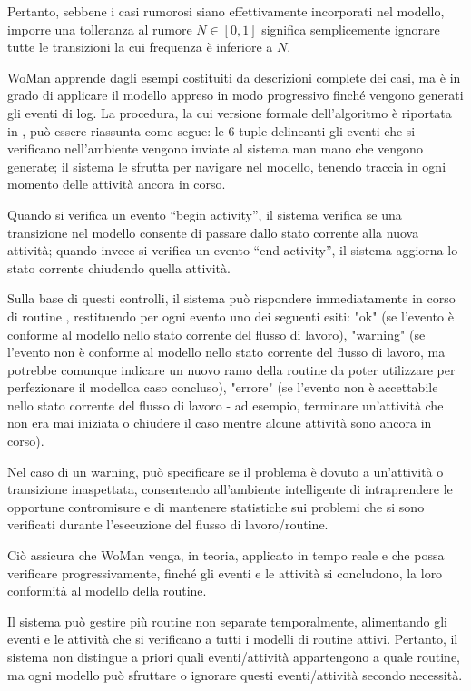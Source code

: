 Pertanto, sebbene i casi rumorosi siano effettivamente incorporati nel modello, imporre una tolleranza al rumore $N \in [0,1]$ significa semplicemente ignorare tutte le transizioni la cui frequenza è inferiore a $N$.

WoMan apprende dagli esempi costituiti da descrizioni complete dei casi, ma è in grado di applicare il modello appreso in modo progressivo finché vengono generati gli eventi di log. La procedura, la cui versione formale dell'algoritmo è riportata in \cite{WoMan}, può essere riassunta come segue: le 6-tuple delineanti gli eventi che si verificano nell'ambiente vengono inviate al sistema man mano che vengono generate; il sistema le sfrutta per navigare nel modello, tenendo traccia in ogni momento delle attività ancora in corso. 

Quando si verifica un evento “begin activity”, il sistema verifica se una transizione nel modello consente di passare dallo stato corrente alla nuova attività; quando invece si verifica un evento “end activity”, il sistema aggiorna lo stato corrente chiudendo quella attività. 

Sulla base di questi controlli, il sistema può rispondere immediatamente in corso di routine , restituendo per ogni evento uno dei seguenti esiti: "ok" (se l'evento è conforme al modello nello stato corrente del flusso di lavoro), "warning" (se l'evento non è conforme al modello nello stato corrente del flusso di lavoro, ma potrebbe comunque indicare un nuovo ramo della routine da poter utilizzare per perfezionare il modelloa caso concluso), "errore" (se l'evento non è accettabile nello stato corrente del flusso di lavoro - ad esempio, terminare un'attività che non era mai iniziata o chiudere il caso mentre alcune attività sono ancora in corso). 

Nel caso di un warning, può specificare se il problema è dovuto a un'attività o transizione inaspettata, consentendo all'ambiente intelligente di intraprendere le opportune contromisure e di mantenere statistiche sui problemi che si sono verificati durante l'esecuzione del flusso di lavoro/routine. 

Ciò assicura che WoMan venga, in teoria, applicato in tempo reale e che possa verificare progressivamente, finché gli eventi e le attività si concludono, la loro conformità al modello della routine. 

Il sistema può gestire più routine non separate temporalmente, alimentando gli eventi e le attività che si verificano a tutti i modelli di routine attivi. Pertanto, il sistema non distingue a priori quali eventi/attività appartengono a quale routine, ma ogni modello può sfruttare o ignorare questi eventi/attività secondo necessità. 

